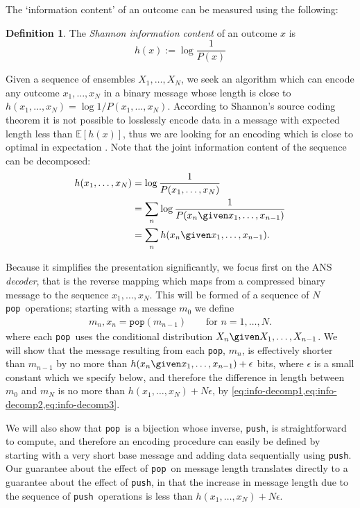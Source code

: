 \documentclass{article}
\theoremstyle{definition}
\newtheorem{definition}{Definition}
\newcommand{\push}{\texttt{push}}
\newcommand{\pop}{\texttt{pop}}
\begin{document}
  The `information content' of an outcome can be measured using the following:
  \begin{definition}
    The \emph{Shannon information content} of an outcome \(x\) is
    \begin{equation}
      h(x) := \log \frac{1}{P(x)}
    \end{equation}
  \end{definition}
  Given a sequence of ensembles \(X_1, \ldots, X_N\), we seek an algorithm
  which can encode any outcome \(x_1, \ldots, x_N\) in a binary message whose
  length is close to \(h(x_1, \ldots, x_N) = \log 1/P(x_1, \ldots, x_N)\).
  According to Shannon's source coding theorem it is not possible to losslessly
  encode data in a message with expected length less than \(\mathbb{E}[h(x)]\),
  thus we are looking for an encoding which is close to optimal in expectation
  \citep{shannon1948}. Note that the joint information content of the sequence
  can be decomposed:
  \begin{align}
    \label{eq:info-decomp1}
    h(x_1, \ldots, x_N)
      &= \log\frac{1}{P(x_1, \ldots, x_N)}\\
      \label{eq:info-decomp2}
      &= \sum_n \log\frac{1}{P(x_n \given x_1, \ldots, x_{n-1})}\\
      \label{eq:info-decomp3}
      &= \sum_n h(x_n \given x_1, \ldots, x_{n-1}).
  \end{align}

  Because it simplifies the presentation significantly, we focus first on the
  ANS \emph{decoder}, that is the reverse mapping which maps from a compressed
  binary message to the sequence \(x_1, \ldots, x_N\). This will be formed of a
  sequence of \(N\) \pop\ operations; starting with a message \(m_0\) we define
  \begin{align}
    m_n, x_n = \pop(m_{n-1})\qquad\text{for }n=1, \ldots, N.
  \end{align}
  where each \pop\ uses the conditional distribution \(X_n\given X_1, \ldots,
  X_{n-1}\). We will show that the message resulting from each \pop, \(m_n\),
  is effectively shorter than \(m_{n-1}\) by no more than \(h(x_n \given x_1,
  \ldots, x_{n-1}) + \epsilon\) bits, where \(\epsilon\) is a small constant
  which we specify below, and therefore the difference in length between
  \(m_0\) and \(m_N\) is no more than \(h(x_1, \ldots, x_N) + N\epsilon\), by
  \cref{eq:info-decomp1,eq:info-decomp2,eq:info-decomp3}.

  We will also show that \pop\ is a bijection whose inverse, \push, is
  straightforward to compute, and therefore an encoding procedure can easily be
  defined by starting with a very short base message and adding data
  sequentially using \push. Our guarantee about the effect of \pop\ on message
  length translates directly to a guarantee about the effect of \push, in that
  the increase in message length due to the sequence of \push\ operations is
  less than \(h(x_1, \ldots, x_N) + N\epsilon\).
\end{document}
